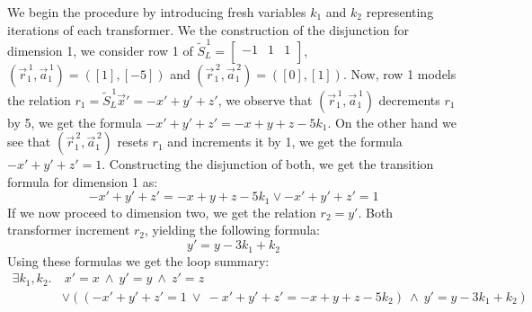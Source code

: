 We begin the procedure by introducing fresh variables $k_1$ and $k_2$ representing iterations of each transformer. We the construction of the disjunction for dimension 1, we consider row 1 of $\tilde{S}_L^{\, 1} = 	\begin{bmatrix}
	-1 & 1 & 1 \\
\end{bmatrix}$, $(\vec{r}^{\, 1}_1, \vec{a}^{\, 1}_1) = ([1], [-5])$ and $(\vec{r}^{\, 2}_1, \vec{a}^{\, 2}_1) = ([0], [1])$. Now, row 1 models the relation $ r_1 = \tilde{S}_L^{\, 1}\vec{x}' = -x' + y' + z'$, we observe that $(\vec{r}^{\, 1}_1, \vec{a}^{\, 1}_1)$ decrements $r_1$ by 5, we get the formula $-x' + y' + z' = -x + y + z - 5k_1$. On the other hand we see that $(\vec{r}^{\, 2}_1, \vec{a}^{\, 2}_1)$ resets $r_1$ and increments it by 1, we get the formula $-x' + y' + z' = 1$. Constructing the disjunction of both, we get the transition formula for dimension 1 as:
\begin{equation*}
	 -x' + y' + z' = -x + y + z - 5k_1 \lor -x' + y' + z' = 1
\end{equation*}
If we now proceed to dimension two, we get the relation $r_ 2 = y'$. Both transformer increment $r_2$, yielding the following formula:
\begin{equation*}
	y' = y - 3k_1 + k_2
\end{equation*}
Using these formulas we get the loop summary:
\begin{align*}
	\exists k_1, k_2.&\ x' = x\ \land\ y' = y\ \land\ z' = z \\ &\lor ((-x' + y' + z' = 1\ \lor\ -x' + y' + z' = -x + y + z - 5k_2)\ \land\ y' = y - 3k_1 + k_2)\ \\ 
\end{align*}
